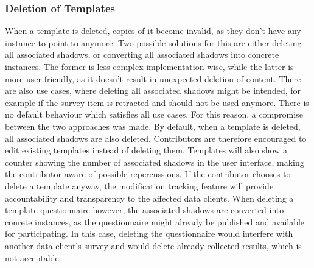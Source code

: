 \documentclass[a4paper,11pt]{article}
\begin{document}
                \subsubsection{Deletion of Templates}
                    When a template is deleted, copies of it become invalid,
                    as they don't have any instance to point to anymore.
                    Two possible solutions for this are either deleting
                    all associated shadows, or converting all associated
                    shadows into concrete instances. 
                    The former is less complex implementation wise, while the 
                    latter is more user-friendly, as it doesn't result in unexpected 
                    deletion of content. There are also use cases, where
                    deleting all associated shadows might be intended,
                    for example if the survey item is retracted
                    and should not be used anymore. There is no
                    default behaviour which satisfies all use cases.
                    For this reason, a compromise between the two
                    approaches was made. By default, when a template
                    is deleted, all associated shadows are also deleted.
                    Contributors are therefore encouraged to edit existing
                    templates instead of deleting them. Templates
                    will also show a counter showing the number of
                    associated shadows in the user interface, making the
                    contributor aware of possible repercussions.
                    If the contributor chooses to delete a template anyway,
                    the modification tracking feature will provide
                    accountability and transparency to the affected data clients.
                    When deleting a template questionnaire however, the
                    associated shadows are converted into conrete instances,
                    as the questionnaire might already be published and
                    available for participating. In this case, deleting
                    the questionnaire would interfere with another data
                    client's survey and would delete already collected results,
                    which is not acceptable.
\end{document}
